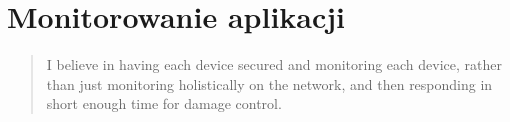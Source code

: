 \chapter[Monitorowania aplikacji]{Monitorowanie aplikacji}
\label{chapter:monitoring}

\begin{quote}
    I believe in having each device secured and monitoring each device, rather than just
    monitoring holistically on the network, and then responding in short enough time for damage control.
\end{quote}



